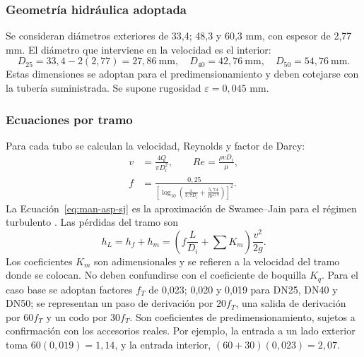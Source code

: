 \subsubsection{Geometría hidráulica adoptada}
Se consideran diámetros exteriores de 33,4; 48,3 y 60,3 mm, con espesor
de 2,77 mm. El diámetro que interviene en la velocidad es el interior:
\begin{equation}
 D_{25}=33{,}4-2(2{,}77)=27{,}86\ \mathrm{mm},\quad
 D_{40}=42{,}76\ \mathrm{mm},\quad D_{50}=54{,}76\ \mathrm{mm}.
\end{equation}
Estas dimensiones se adoptan para el predimensionamiento y deben cotejarse
con la tubería suministrada. Se supone rugosidad $\varepsilon=0{,}045$ mm.

\subsubsection{Ecuaciones por tramo}
Para cada tubo se calculan la velocidad, Reynolds y factor de Darcy:
\begin{align}
 v&=\frac{4Q}{\pi D_i^2},\qquad Re=\frac{\rho vD_i}{\mu},
 \label{eq:man-asp-vre}\\
 f&=\frac{0{,}25}{\left[\log_{10}\left(
 \frac{\varepsilon}{3{,}7D_i}+\frac{5{,}74}{Re^{0{,}9}}\right)\right]^2}.
 \label{eq:man-asp-sj}
\end{align}
La Ecuación~\eqref{eq:man-asp-sj} es la aproximación de Swamee--Jain para
el régimen turbulento \cite{manSwamee}. Las pérdidas del tramo son
\begin{equation}
 h_L=h_f+h_m
 =\left(f\frac{L}{D_i}+\sum K_m\right)\frac{v^2}{2g}.
 \label{eq:man-asp-hl}
\end{equation}
Los coeficientes $K_m$ son adimensionales y se refieren a la velocidad del
tramo donde se colocan. No deben confundirse con el coeficiente de boquilla
$K_q$. Para el caso base se adoptan factores $f_T$ de 0,023; 0,020 y 0,019
para DN25, DN40 y DN50; se representan un paso de derivación por $20f_T$,
una salida de derivación por $60f_T$ y un codo por $30f_T$.
Son coeficientes de predimensionamiento, sujetos a confirmación con los
accesorios reales. Por ejemplo, la entrada a un lado exterior toma
$60(0{,}019)=1{,}14$, y la entrada interior,
$(60+30)(0{,}023)=2{,}07$.

